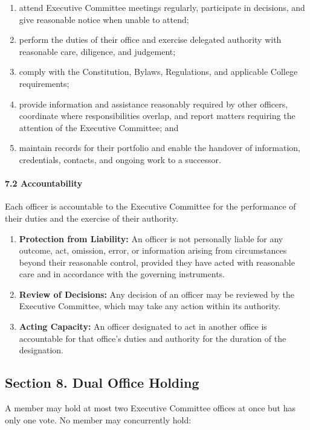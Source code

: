 \documentclass[a4paper]{article}
\begin{document}
\begin{enumerate}
  \item attend Executive Committee meetings regularly, participate in decisions, and give
  reasonable notice when unable to attend;
  \item perform the duties of their office and exercise delegated authority with reasonable
  care, diligence, and judgement;
  \item comply with the Constitution, Bylaws, Regulations, and applicable College
  requirements;
  \item provide information and assistance reasonably required by other officers, coordinate
  where responsibilities overlap, and report matters requiring the attention of the Executive
  Committee; and
  \item maintain records for their portfolio and enable the handover of information,
  credentials, contacts, and ongoing work to a successor.
\end{enumerate}

\paragraph{7.2 Accountability}
Each officer is accountable to the Executive Committee for the performance of their
duties and the exercise of their authority.

\begin{enumerate}
  \item \textbf{Protection from Liability:} An officer is not personally liable for any
  outcome, act, omission, error, or information arising from circumstances beyond their
  reasonable control, provided they have acted with reasonable care and in accordance
  with the governing instruments.
  \item \textbf{Review of Decisions:} Any decision of an officer may be reviewed by the
  Executive Committee, which may take any action within its authority.
  \item \textbf{Acting Capacity:} An officer designated to act in another office is
  accountable for that office's duties and authority for the duration of the designation.
\end{enumerate}

\subsection*{Section 8. Dual Office Holding}
A member may hold at most two Executive Committee offices at once but has only one vote.
No member may concurrently hold:
\end{document}
